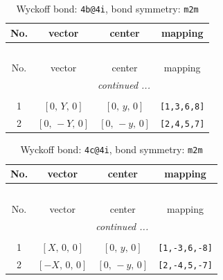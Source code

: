 \documentclass[fleqn,8pt]{jsarticle}
\begin{document}
\renewcommand{\arraystretch}{1.2}
\begin{longtable}{cccc}
\caption{Wyckoff bond: {\tt 4b@4i}, bond symmetry: {\tt m2m}}
 \\
 \hline \hline
No. & vector & center & mapping \\ \hline \endfirsthead

\multicolumn{3}{l}{\tablename\ \thetable{}} \\
 \hline \hline
No. & vector & center & mapping \\ \hline \endhead

 \hline \hline
\multicolumn{3}{r}{\footnotesize\it continued ...} \\ \endfoot

 \hline \hline
\multicolumn{3}{r}{} \\ \endlastfoot

1 & $\left[ 0,\, Y,\, 0 \right]$ & $\left[ 0,\, y,\, 0 \right]$ & {\tt [1,3,6,8]} \\ \hline
2 & $\left[ 0,\, - Y,\, 0 \right]$ & $\left[ 0,\, - y,\, 0 \right]$ & {\tt [2,4,5,7]} \\
\end{longtable}
\renewcommand{\arraystretch}{1.2}
\begin{longtable}{cccc}
\caption{Wyckoff bond: {\tt 4c@4i}, bond symmetry: {\tt m2m}}
 \\
 \hline \hline
No. & vector & center & mapping \\ \hline \endfirsthead

\multicolumn{3}{l}{\tablename\ \thetable{}} \\
 \hline \hline
No. & vector & center & mapping \\ \hline \endhead

 \hline \hline
\multicolumn{3}{r}{\footnotesize\it continued ...} \\ \endfoot

 \hline \hline
\multicolumn{3}{r}{} \\ \endlastfoot

1 & $\left[ X,\, 0,\, 0 \right]$ & $\left[ 0,\, y,\, 0 \right]$ & {\tt [1,-3,6,-8]} \\ \hline
2 & $\left[ - X,\, 0,\, 0 \right]$ & $\left[ 0,\, - y,\, 0 \right]$ & {\tt [2,-4,5,-7]} \\
\end{longtable}
\renewcommand{\arraystretch}{1.2}
\end{document}
